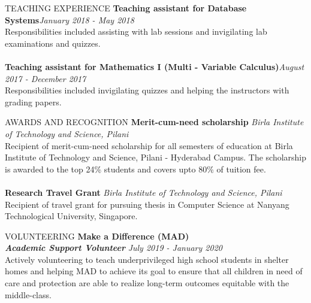 \documentclass{resume} %
\begin{document}
\begin{rSection}{TEACHING EXPERIENCE}
{\bf Teaching assistant for Database Systems}{\hfill \it January 2018 - May 2018}
\\ Responsibilities included assisting with lab sessions and invigilating lab examinations and quizzes. \\ \\
{\bf Teaching assistant for Mathematics I (Multi - Variable Calculus)}{\hfill \it August 2017 - December 2017}
\\ Responsibilities included invigilating quizzes and helping the instructors with grading papers.

\end{rSection}

\begin{rSection}{AWARDS AND RECOGNITION}
{\bf Merit-cum-need scholarship}
{\hfill \it Birla Institute of Technology and Science, Pilani}
\\ Recipient of merit-cum-need scholarship for all semesters of education at Birla Institute of Technology and Science, Pilani - Hyderabad Campus. The scholarship is awarded to the top 24\% students and covers upto 80\% of tuition fee. \\ \\
{\bf Research Travel Grant}
{\hfill \it Birla Institute of Technology and Science, Pilani}
\\ Recipient of travel grant for pursuing thesis in Computer Science at Nanyang Technological University, Singapore.

\end{rSection}

\begin{rSection}{VOLUNTEERING}
{\bf Make a Difference (MAD)}\\
{\bf \textit{Academic Support Volunteer}} {\hfill \it July 2019 - January 2020}\\
Actively volunteering to teach underprivileged high school students in shelter homes and helping MAD to achieve it\textquotesingle s goal to ensure that all children in need of care and protection are able to realize long-term outcomes equitable with the middle-class.

\end{rSection}
\end{document}
